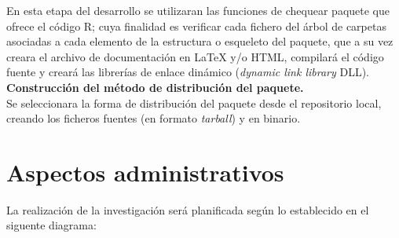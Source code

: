 En esta etapa del desarrollo se utilizaran las funciones de chequear paquete que ofrece el código R; cuya finalidad es verificar cada fichero del árbol de carpetas asociadas a cada elemento de la estructura o esqueleto del paquete, que a su vez creara el archivo de documentación en LaTeX y/o HTML, compilará el código fuente y creará las librerías de enlace dinámico (\emph{dynamic link library} DLL).\\  

\noindent
\textbf{Construcci\'on del m\'etodo de distribuci\'on del paquete.}\\

Se seleccionara la forma de distribución del paquete desde el repositorio local, creando los ficheros fuentes  (en formato  \emph{tarball})  y en binario.\\

\section{Aspectos administrativos}

\vspace{1 cm}
La realización de la investigación será planificada según lo establecido en el siguente diagrama:\\

